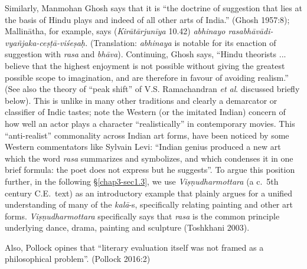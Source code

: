 Similarly, Manmohan Ghosh says that it is “the doctrine of suggestion that lies at the basis of Hindu plays and indeed of all other arts of India.” (Ghosh 1957:8); Mallinātha, for example, says (\textsl{Kirātārjunīya} 10.42) \textsl{abhinayo rasabhāvādi-vyañjaka-ceṣṭā-viśeṣaḥ.} (Translation: \textsl{abhinaya} is notable for its enaction of suggestion with \textsl{rasa} and \textsl{bhāva}). Continuing, Ghosh says, “Hindu theorists ... believe that the highest enjoyment is not possible without giving the greatest possible scope to imagination, and are therefore in favour of avoiding realism.” (See also the theory of “peak shift” of V.S. Ramachandran \textsl{et al}. discussed briefly below). This is unlike in many other traditions and clearly a demarcator or classifier of Indic tastes; note the Western (or the imitated Indian) concern of how well an actor plays a character “realistically” in contemporary movies. This “anti-realist” commonality across Indian art forms, have been noticed by some Western commentators like Sylvain Levi: “Indian genius produced a new art which the word \textsl{rasa} summarizes and symbolizes, and which condenses it in one brief formula: the poet does not express but he suggests”. To argue this position further, in the following \S\ref{chap3-sec1.3}, we use \textsl{Viṣṇudharmottara} (a c.\ 5th century C.E.\ text) as an introductory example that plainly argues for a unified understanding of many of the \textsl{kalā}-s, specifically relating painting and other art forms. \textsl{Viṣṇudharmottara} specifically says that \textsl{rasa} is the common principle underlying dance, drama, painting and sculpture (Toshkhani 2003).

Also, Pollock opines that “literary evaluation itself was not framed as a philosophical problem”. (Pollock 2016:2)


